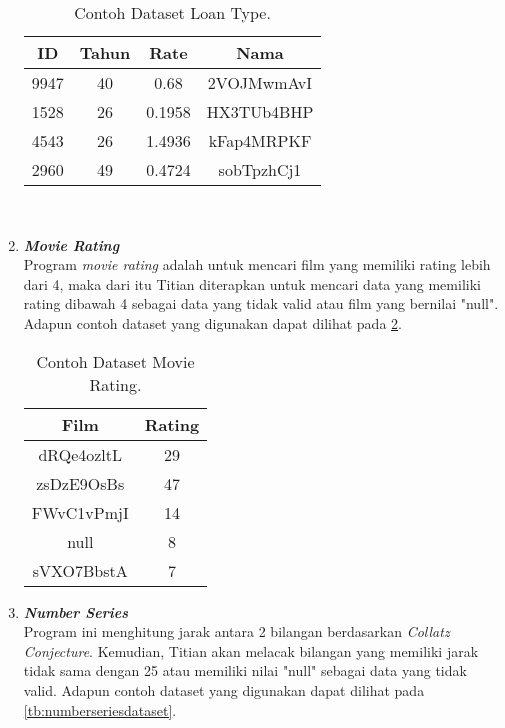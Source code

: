 \begin{enumerate}
            \begin{longtable}{|c|c|c|c|}
                  \caption{Contoh Dataset Loan Type.}
                  \label{tb:loantypedataset} \\
                  \hline
                  \rowcolor[HTML]{C0C0C0}
                  \textbf{ID} & \textbf{Tahun} & \textbf{Rate} & \textbf{Nama} \\
                  \hline
                  9947 & 40 & 0.68 & 2VOJMwmAvI \\
                  1528 & 26 & 0.1958 & HX3TUb4BHP \\
                  4543 & 26 & 1.4936 & kFap4MRPKF \\
                  2960 & 49 & 0.4724 & sobTpzhCj1 \\
                  \hline
            \end{longtable}

      \

      \item \emph{\textbf{Movie Rating}} \\
            Program \emph{movie rating} adalah untuk mencari film yang memiliki rating lebih dari 4, maka dari itu Titian diterapkan untuk mencari data yang memiliki rating dibawah 4 sebagai data yang tidak valid atau film yang bernilai "null".
            Adapun contoh dataset yang digunakan dapat 
            dilihat pada \ref{tb:movieratingdataset}.

            \begin{longtable}{|c|c|}
                  \caption{Contoh Dataset Movie Rating.}
                  \label{tb:movieratingdataset} \\
                  \hline
                  \rowcolor[HTML]{C0C0C0}
                  \textbf{Film} & \textbf{Rating} \\
                  \hline
                  dRQe4ozltL & 29 \\
                  zsDzE9OsBs & 47 \\
                  FWvC1vPmjI & 14 \\
                  null & 8 \\
                  sVXO7BbstA & 7 \\
                  \hline
            \end{longtable}

      \item \emph{\textbf{Number Series}} \\
            Program ini menghitung jarak antara 2 bilangan berdasarkan \emph{Collatz Conjecture}. Kemudian, Titian akan melacak bilangan yang memiliki jarak tidak sama dengan 25 atau memiliki nilai "null" sebagai data yang tidak valid.
            Adapun contoh dataset yang digunakan dapat 
            dilihat pada \ref{tb:numberseriesdataset}.


\end{enumerate}
